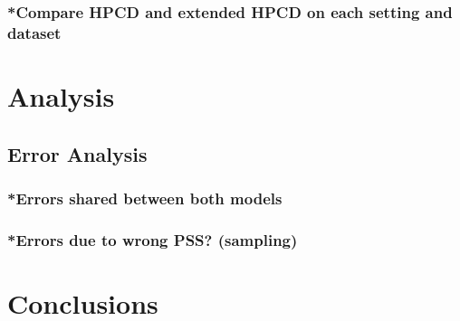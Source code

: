 \subsubsection{*Compare HPCD and extended HPCD on each setting and dataset}

\section{Analysis}
\subsection{Error Analysis}
\subsubsection{*Errors shared between both models}
\subsubsection{*Errors due to wrong PSS? (sampling)}

\section{Conclusions}
